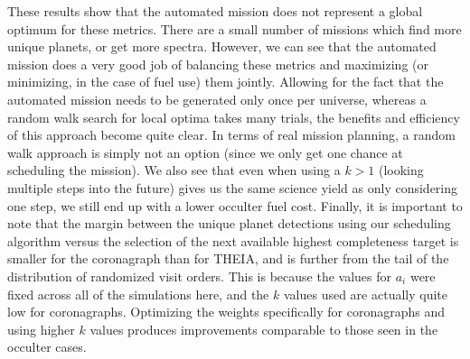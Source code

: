 These results show that the automated mission does not represent a global optimum for these metrics.  There are a small number of missions which find more unique planets, or get more spectra.  However, we can see that the automated mission does a very good job of balancing these metrics and maximizing (or minimizing, in the case of fuel use) them jointly.  Allowing for the fact that the automated mission needs to be generated only once per universe, whereas a random walk search for local optima takes many trials, the benefits and efficiency of this approach become quite clear.  In terms of real mission planning, a random walk approach is simply not an option (since we only get one chance at scheduling the mission).  We also see that even when using a $k > 1$ (looking multiple steps into the future) gives us the same science yield as only considering one step, we still end up with a lower occulter fuel cost.  Finally, it is important to note that the margin between the unique planet detections using our scheduling algorithm versus the selection of the next available highest completeness target is smaller for the coronagraph than for THEIA, and is further from the tail of the distribution of randomized visit orders.  This is because the values for $a_i$ were fixed across all of the simulations here, and the $k$ values used are actually quite low for coronagraphs.  Optimizing the weights specifically for coronagraphs and using higher $k$ values produces improvements comparable to those seen in the occulter cases.

